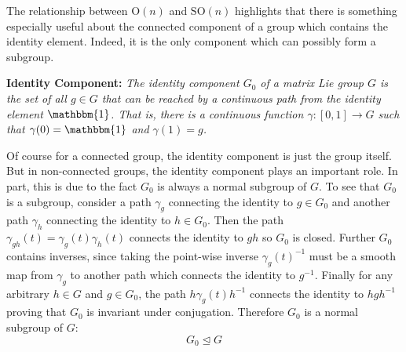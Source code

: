 \documentclass{article}
\renewcommand{\t}[1]{\text{#1}}
\newcommand{\definition}[2]{
	\begin{center}
		\begin{tcolorbox}[colframe=MidnightBlue, colback=black!5, arc=2mm, outer arc=0.5mm, width=\linewidth, left=2mm, right=2mm]
			\textbf{#1:} \emph{#2}	
		\end{tcolorbox}
	\end{center}\noindent}
\begin{document}
The relationship between $\t{O}(n)$ and $\t{SO}(n)$ highlights that there is something especially useful about the connected component of a group which contains the identity element. Indeed, it is the only component which can possibly form a subgroup.
\definition{Identity Component}{The identity component $G_0$ of a matrix Lie group $G$ is the set of all $g\in G$ that can be reached by a continuous path from the identity element $\mathbbm{1}$. That is, there is a continuous function $\gamma:[0,1]\to G$ such that $\gamma(0)=\mathbbm{1}$ and $\gamma(1)=g$.}
Of course for a connected group, the identity component is just the group itself. But in non-connected groups, the identity component plays an important role. In part, this is due to the fact $G_0$ is always a normal subgroup of $G$. To see that $G_0$ is a subgroup, consider a path $\gamma_g$ connecting the identity to $g\in G_0$ and another path $\gamma_h$ connecting the identity to $h\in G_0$. Then the path $\gamma_{gh}(t)=\gamma_g(t)\gamma_h(t)$ connects the identity to $gh$ so $G_0$ is closed. Further $G_0$ contains inverses, since taking the point-wise inverse $\gamma_g(t)^{-1}$ must be a smooth map from $\gamma_g$ to another path which connects the identity to $g^{-1}$. Finally for any arbitrary $h\in G$ and $g\in G_0$, the path $ h\gamma_g(t)h^{-1}$ connects the identity to $hgh^{-1}$ proving that $G_0$ is invariant under conjugation. Therefore $G_0$ is a normal subgroup of $G$:
$$ G_0\trianglelefteq G $$






\newpage
\end{document}
